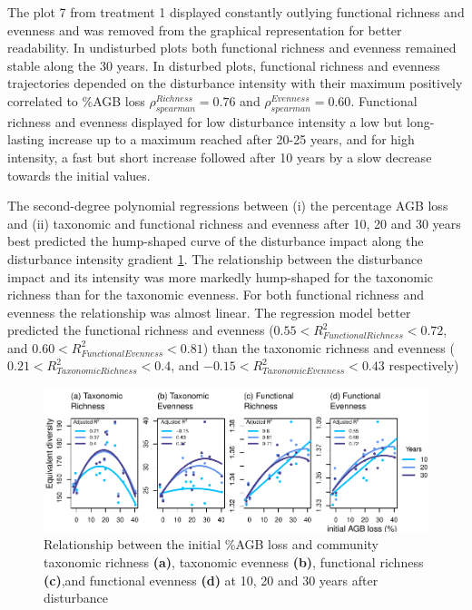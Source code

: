 \documentclass[
  11pt,
  french,
  A4paper,
  extrafontsizes,onecolumn,openright
  ]{memoir}
\begin{document}
The plot 7 from treatment 1 displayed constantly outlying functional
richness and evenness and was removed from the graphical representation
for better readability. In undisturbed plots both functional richness
and evenness remained stable along the 30 years. In disturbed plots,
functional richness and evenness trajectories depended on the
disturbance intensity with their maximum positively correlated to \%AGB
loss \(\rho_{spearman}^{Richness}=0.76\) and
\(\rho_{spearman}^{Evenness}=0.60\). Functional richness and evenness
displayed for low disturbance intensity a low but long-lasting increase
up to a maximum reached after 20-25 years, and for high intensity, a
fast but short increase followed after 10 years by a slow decrease
towards the initial values.

The second-degree polynomial regressions between (i) the percentage AGB
loss and (ii) taxonomic and functional richness and evenness after 10,
20 and 30 years best predicted the hump-shaped curve of the disturbance
impact along the disturbance intensity gradient \ref{fig:IDHplot}. The
relationship between the disturbance impact and its intensity was more
markedly hump-shaped for the taxonomic richness than for the taxonomic
evenness. For both functional richness and evenness the relationship was
almost linear. The regression model better predicted the functional
richness and evenness (\(0.55<R^2_{Functional Richness}<0.72\), and
\(0.60<R^2_{Functional Evenness}<0.81\)) than the taxonomic richness and
evenness (\(0.21<R^2_{Taxonomic Richness}<0.4\), and
\(-0.15<R^2_{Taxonomic Evenness}<0.43\) respectively)

\begin{figure}

{\centering \includegraphics[width=1\linewidth]{Manuscript_files/figure-latex/IDHplot-1} 

}

\caption{Relationship between the initial \%AGB loss and community taxonomic richness \textbf{(a)}, taxonomic evenness \textbf{(b)}, functional richness \textbf{(c)},and functional evenness \textbf{(d)} at 10, 20 and 30 years after disturbance}\label{fig:IDHplot}
\end{figure}
\end{document}
